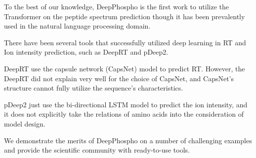  
To the best of our knowledge, DeepPhospho is the first work to utilize the Transformer on the peptide spectrum prediction
though it has been prevalently used in the natural language processing domain.

There have been several tools that successfully utilized deep learning in RT and Ion intensity prediction, such as DeepRT\cite{ma2018improved} and pDeep2\cite{zeng2019ms}.

DeepRT use the capsule network (CapsNet) \cite{sabour2017dynamic} 
model to predict RT. However, the DeepRT did not explain very well for the choice of CapsNet, and CapsNet's structure cannot fully utilize the sequence's characteristics.
 
pDeep2 just use the bi-directional LSTM model to predict the ion intensity, and it does not explicitly take the relations of amino acids into the consideration of model design.


We demonstrate the merits of DeepPhospho on a number of challenging examples and provide the scientific community 
with ready-to-use tools.
